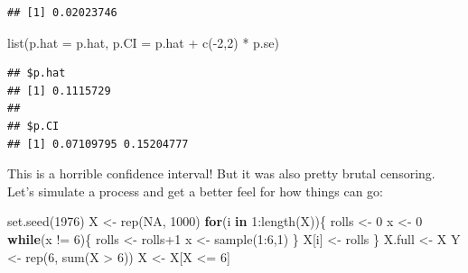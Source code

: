 \documentclass[]{tufte-handout}
\newenvironment{Shaded}{}{}
\newcommand{\AttributeTok}[1]{\textcolor[rgb]{0.49,0.56,0.16}{#1}}
\newcommand{\ConstantTok}[1]{\textcolor[rgb]{0.53,0.00,0.00}{#1}}
\newcommand{\ControlFlowTok}[1]{\textcolor[rgb]{0.00,0.44,0.13}{\textbf{#1}}}
\newcommand{\DecValTok}[1]{\textcolor[rgb]{0.25,0.63,0.44}{#1}}
\newcommand{\FunctionTok}[1]{\textcolor[rgb]{0.02,0.16,0.49}{#1}}
\newcommand{\NormalTok}[1]{#1}
\newcommand{\OtherTok}[1]{\textcolor[rgb]{0.00,0.44,0.13}{#1}}
\newcommand{\SpecialCharTok}[1]{\textcolor[rgb]{0.25,0.44,0.63}{#1}}
\begin{document}
\begin{verbatim}
## [1] 0.02023746
\end{verbatim}

\begin{Shaded}
\begin{Highlighting}[]
\FunctionTok{list}\NormalTok{(}\AttributeTok{p.hat =}\NormalTok{ p.hat, }\AttributeTok{p.CI =}\NormalTok{ p.hat }\SpecialCharTok{+} \FunctionTok{c}\NormalTok{(}\SpecialCharTok{{-}}\DecValTok{2}\NormalTok{,}\DecValTok{2}\NormalTok{) }\SpecialCharTok{*}\NormalTok{ p.se)}
\end{Highlighting}
\end{Shaded}

\begin{verbatim}
## $p.hat
## [1] 0.1115729
## 
## $p.CI
## [1] 0.07109795 0.15204777
\end{verbatim}

This is a horrible confidence interval! But it was also pretty brutal
censoring. Let's simulate a process and get a better feel for how things
can go:

\begin{Shaded}
\begin{Highlighting}[]
\FunctionTok{set.seed}\NormalTok{(}\DecValTok{1976}\NormalTok{)}
\NormalTok{X }\OtherTok{\textless{}{-}} \FunctionTok{rep}\NormalTok{(}\ConstantTok{NA}\NormalTok{, }\DecValTok{1000}\NormalTok{)}
\ControlFlowTok{for}\NormalTok{(i }\ControlFlowTok{in} \DecValTok{1}\SpecialCharTok{:}\FunctionTok{length}\NormalTok{(X))\{}
\NormalTok{    rolls }\OtherTok{\textless{}{-}} \DecValTok{0}
\NormalTok{    x }\OtherTok{\textless{}{-}} \DecValTok{0}
    \ControlFlowTok{while}\NormalTok{(x }\SpecialCharTok{!=} \DecValTok{6}\NormalTok{)\{}
\NormalTok{        rolls }\OtherTok{\textless{}{-}}\NormalTok{ rolls}\SpecialCharTok{+}\DecValTok{1}
\NormalTok{        x }\OtherTok{\textless{}{-}} \FunctionTok{sample}\NormalTok{(}\DecValTok{1}\SpecialCharTok{:}\DecValTok{6}\NormalTok{,}\DecValTok{1}\NormalTok{)}
\NormalTok{    \}}
\NormalTok{    X[i] }\OtherTok{\textless{}{-}}\NormalTok{ rolls}
\NormalTok{\}}
\NormalTok{X.full }\OtherTok{\textless{}{-}}\NormalTok{ X}
\NormalTok{Y }\OtherTok{\textless{}{-}} \FunctionTok{rep}\NormalTok{(}\DecValTok{6}\NormalTok{, }\FunctionTok{sum}\NormalTok{(X }\SpecialCharTok{\textgreater{}} \DecValTok{6}\NormalTok{))}
\NormalTok{X }\OtherTok{\textless{}{-}}\NormalTok{ X[X }\SpecialCharTok{\textless{}=} \DecValTok{6}\NormalTok{]}
\end{Highlighting}
\end{Shaded}
\end{document}
